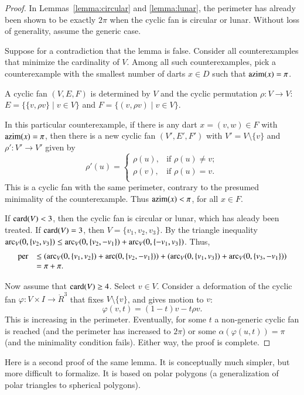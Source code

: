 \begin{proof} In Lemmas~\ref{lemma:circular} and \ref{lemma:lunar}, the perimeter has already been shown to be exactly $2\pi$ when the cyclic fan is circular or lunar.  Without loss of generality, assume the generic case.

Suppose for a contradiction that the lemma is false.  Consider all counterexamples
that minimize the cardinality of $V$.  Among all such counterexamples, pick a counterexample with the smallest number of darts $x\in D$ such that ${\operatorname{azim}}(x) = \pi$.

A cyclic fan $(V,E,F)$ is determined by $V$ and the cyclic permutation $\rho:V\to V$:  $E=\{\{v,\rho v\}\mid v\in V\}$ and $F = \{(v,\rho v)\mid v\in V\}$.

In this particular counterexample, if there is any dart $x=(v,w)\in F$ with ${\operatorname{azim}}(x)=\pi$, then there is a new cyclic fan $(V',E',F')$ with $V' = V\setminus\{v\}$ and $\rho':V'\to V'$ given by 
$$
\rho'(u) = \begin{cases}
\rho(u), & \text{if } \rho(u)\ne v;\\
\rho(v), & \text{if }\rho(u) = v.\\
\end{cases}
$$
This is a cyclic fan with the same perimeter, contrary to the presumed minimality of the counterexample.  Thus ${\operatorname{azim}}(x) <\pi$, for all $x\in F$.

If ${\operatorname{card}}(V) <3$, then the cyclic fan is circular or lunar, which has aleady been treated.  If ${\operatorname{card}}(V)=3$, then $V=\{v_1,v_2,v_3\}$.  By the triangle inequality $\operatorname{arc}_V(0,\{v_2,v_3\}) \le \operatorname{arc}_V(0,\{v_2,-v_1\})+\operatorname{arc}_V(0,\{-v_1,v_3\})$.  Thus,
$$
\begin{array}{rll}
{\operatorname{per}} &\le(\operatorname{arc}_V(0,\{v_1,v_2\})+\operatorname{arc}(0,\{v_2,-v_1\}))+(\operatorname{arc}_V(0,\{v_1,v_3\})+\operatorname{arc}_V(0,\{v_3,-v_1\})) \\
   &= \pi+\pi.
\end{array}
$$

Now assume that ${\operatorname{card}}(V)\ge 4$.  Select $v\in V$.  Consider a deformation of the cyclic fan $\varphi:V\times I \to \ring{R}^3$ that fixes $V\setminus\{v\}$, and gives motion to $v$:
$$
\varphi(v,t) = (1-t) v - t \rho v.
$$
This is increasing in the perimeter.  Eventually, for some $t$ a non-generic cyclic fan is reached (and the perimeter has increased to $2\pi$) or some $\alpha(\varphi(u,t))=\pi$ (and the minimality condition fails).  Either way, the proof is complete. 
\end{proof}

Here is a second proof of the same lemma.  It is conceptually much simpler, but more difficult to formalize.  It is based on polar polygons (a generalization of polar triangles to spherical polygons).

